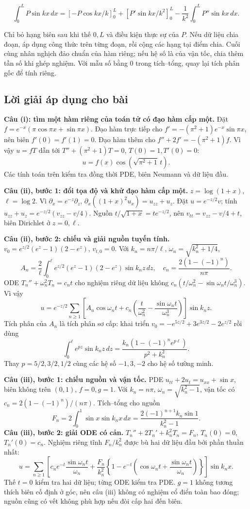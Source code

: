 \documentclass[10pt,a4paper]{article}
\begin{document}
\[
\int_0^L P\sin kx\,dx
=\left[-P\cos kx/k\right]_0^L+
\left[P'\sin kx/k^2\right]_0^L-
\frac1{k^2}\int_0^L P''\sin kx\,dx.
\]


Chỉ bỏ hạng biên sau khi thế $0,L$ và điều kiện thực sự của $P$. Nếu dữ liệu chia đoạn, áp dụng công thức trên từng đoạn, rồi cộng các hạng tại điểm chia. Cuối cùng nhân nghịch đảo chuẩn của hàm riêng; nếu hệ số là của vận tốc, chia thêm tần số khi ghép nghiệm. Với mẫu số bằng $0$ trong tích–tổng, quay lại tích phân gốc để tính riêng.
\subsection*{Lời giải áp dụng cho bài}
\textbf{Câu (i): tìm một hàm riêng của toán tử có đạo hàm cấp một.} Đặt $f=e^{-x}(\pi\cos\pi x+\sin\pi x)$. Đạo hàm trực tiếp cho $f'=-(\pi^2+1)e^{-x}\sin\pi x$, nên biên $f'(0)=f'(1)=0$. Đạo hàm thêm cho $f''+2f'=-(\pi^2+1)f$. Vì vậy $u=fT$ dẫn tới $T''+(\pi^2+1)T=0$, $T(0)=1,T'(0)=0$:
\[u=f(x)\cos(\sqrt{\pi^2+1}\,t).\]
Các tính toán trên kiểm tra đồng thời PDE, biên Neumann và dữ liệu đầu.

\textbf{Câu (ii), bước 1: đổi tọa độ và khử đạo hàm cấp một.} $z=\log(1+x)$, $\ell=\log2$. Vì $\partial_x=e^{-z}\partial_z$, $\partial_x((1+x)^2u_x)=u_{zz}+u_z$. Đặt $u=e^{-z/2}v$; tính $u_{zz}+u_z=e^{-z/2}(v_{zz}-v/4)$. Nguồn $t/\sqrt{1+x}=te^{-z/2}$, nên $v_{tt}=v_{zz}-v/4+t$, biên Dirichlet ở $z=0,\ell$.

\textbf{Câu (ii), bước 2: chiếu và giải nguồn tuyến tính.} $v_0=e^{z/2}(e^z-1)(2-e^z)$, $v_{t,0}=0$. Với $k_n=n\pi/\ell$, $\omega_n=\sqrt{k_n^2+1/4}$,
\[A_n=\frac2\ell\int_0^\ell e^{z/2}(e^z-1)(2-e^z)\sin k_nz\,dz,\quad c_n=\frac{2(1-(-1)^n)}{n\pi}.\]
ODE $T_n''+\omega_n^2T_n=c_nt$ cho nghiệm riêng dữ liệu không $c_n(t/\omega_n^2-\sin\omega_nt/\omega_n^3)$. Vì vậy
\[u=e^{-z/2}\sum_{n\ge1}\left[A_n\cos\omega_nt+c_n\left(\frac t{\omega_n^2}-\frac{\sin\omega_nt}{\omega_n^3}\right)\right]\sin k_nz.\]
Tích phân của $A_n$ là tích phân sơ cấp: khai triển $v_0=-e^{5z/2}+3e^{3z/2}-2e^{z/2}$ rồi dùng
\[\int_0^\ell e^{pz}\sin k_nz\,dz=\frac{k_n(1-(-1)^ne^{p\ell})}{p^2+k_n^2}.\]
Thay $p=5/2,3/2,1/2$ cùng các hệ số $-1,3,-2$ cho hệ số tường minh.

\textbf{Câu (iii), bước 1: chiếu nguồn và vận tốc.} PDE $u_{tt}+2u_t=u_{xx}+\sin x$, biên không trên $(0,1)$, $f=0,g=1$. Với $k_n=n\pi$, $\omega_n=\sqrt{k_n^2-1}$, vận tốc có $c_n=2(1-(-1)^n)/(n\pi)$. Tích–tổng cho nguồn
\[F_n=2\int_0^1\sin x\sin k_nx\,dx=\frac{2(-1)^{n+1}k_n\sin1}{k_n^2-1}.\]
\textbf{Câu (iii), bước 2: giải ODE có cản.} $T_n''+2T_n'+k_n^2T_n=F_n$, $T_n(0)=0$, $T_n'(0)=c_n$. Nghiệm riêng tĩnh $F_n/k_n^2$ được bù hai dữ liệu đầu bởi phần thuần nhất:
\[u=\sum_{n\ge1}\left[c_ne^{-t}\frac{\sin\omega_nt}{\omega_n}+\frac{F_n}{k_n^2}\left\{1-e^{-t}\left(\cos\omega_nt+\frac{\sin\omega_nt}{\omega_n}\right)\right\}\right]\sin k_nx.\]
Thế $t=0$ kiểm tra hai dữ liệu; từng ODE kiểm tra PDE. $g=1$ không tương thích biên cố định ở góc, nên câu (iii) không có nghiệm cổ điển toàn bao đóng; nguồn cũng có vết không phù hợp nếu đòi cấp hai đến biên.
\end{document}
